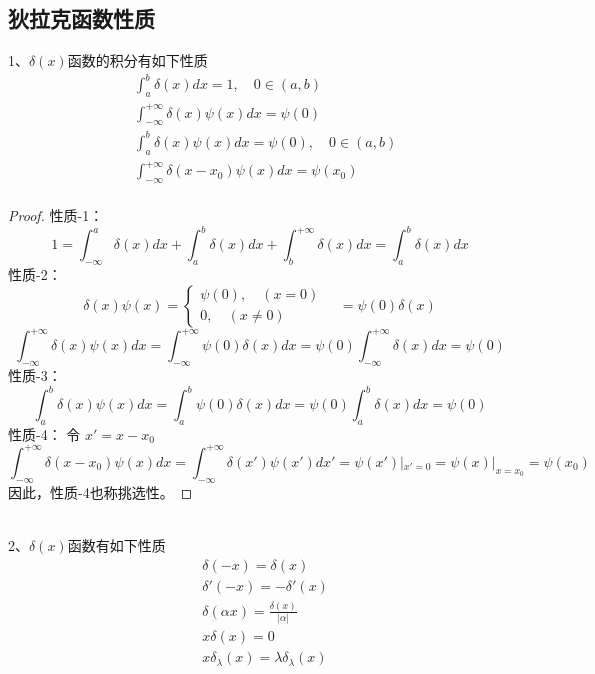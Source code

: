 \subsection{狄拉克函数性质}
1、$\delta(x)$函数的积分有如下性质
	$$\begin{aligned}
		&\int _{a} ^{b} \delta(x) d x=1 , \quad 0 \in (a,b) \\
		&\int_{-\infty}^{+\infty} \delta(x) \psi (x) d x=\psi  (0) \\
		&\int_{a}^{b} \delta(x) \psi (x) d x=\psi (0)  , \quad 0\in(a,b) \\
		&\int_{-\infty}^{+\infty} \delta(x-x_0) \psi (x) d x=\psi  (x_0)\\
	\end{aligned}$$
\begin{proof} 
性质-1：
\[ 1 = \int_{-\infty}^{a} \delta(x) d x + \int _{a} ^{b} \delta(x) d x + \int _{b} ^{+\infty} \delta(x) d x = \int _{a} ^{b} \delta(x) d x \]
性质-2：
\[\delta(x) \psi (x) = \left\{\begin{aligned}
	\psi (0), \quad(x=0) \\
	0, \quad(x \neq 0)
\end{aligned}\right. \quad = \psi (0) \delta(x) \]
\[ \int_{-\infty}^{+\infty} \delta(x) \psi (x) d x= \int_{-\infty}^{+\infty} \psi  (0)\delta(x)d x = \psi (0) \int_{-\infty}^{+\infty} \delta(x)d x = \psi  (0)\]
性质-3：
  \[ \int_{a}^{b} \delta(x) \psi (x) d x= \int_{a}^{b} \psi  (0)\delta(x)d x = \psi (0) \int_{a}^{b} \delta(x)d x = \psi  (0)\]
性质-4： 令 $x'=x-x_0$
\[ \int_{-\infty}^{+\infty} \delta(x-x_0) \psi (x) d x = \int_{-\infty}^{+\infty} \delta(x') \psi (x') d x'= \psi (x')|_{x'=0} = \psi (x)|_{x=x_0} = \psi (x_0)  \]
因此，性质-4也称挑选性。
\end{proof} 

~~\\
2、$\delta(x)$函数有如下性质
$$\begin{aligned}
		&\delta(-x)=\delta(x) \\
		&\delta'( -x ) = - \delta'( x ) \\
		&\delta(\alpha x ) = \frac{\delta( x ) }{\left|\alpha \right|} \\
		&x\delta( x ) = 0 \\
		&x\delta_{\lambda}( x ) = \lambda \delta_{\lambda}( x ) \\
\end{aligned}$$

